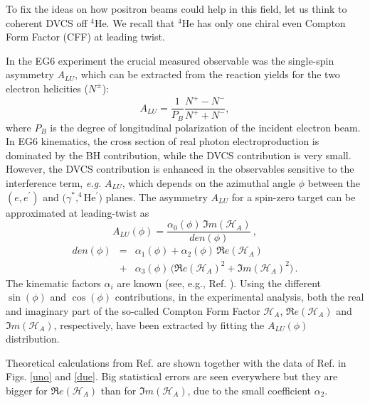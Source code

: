 \documentclass[times, twoside]{PosWhiPap}
\begin{document}
To fix the ideas on how positron beams could help in this field, 
let us think to coherent DVCS off $^4$He.
We recall that
$^4$He has only one chiral even 
Compton Form Factor (CFF) at leading twist.

In the EG6 experiment the crucial measured
observable was the single-spin asymmetry
$A_{LU}$, which can be 
extracted from the reaction yields for the two electron
helicities ($N^{\pm}$):
\begin{equation}
A_{LU} = \frac{1}{P_{B}} \frac{N^{+} - N^{-}}{N^{+} + N^{-} },
\end{equation}
where $P_{B}$ is the degree of longitudinal polarization of the incident 
electron beam.
 In EG6 kinematics, 
the cross section of real photon 
electroproduction is dominated by the BH contribution, while the DVCS 
contribution is very small. However, the DVCS contribution is
enhanced in the observables sensitive to the interference term, {\it e.g.} 
$A_{LU}$, which depends on the
azimuthal angle $\phi$ between the $(e,e^\prime)$ and 
$(\gamma^*,^4$He$^\prime)$ planes.
The asymmetry $A_{LU}$ 
for a spin-zero target can be approximated at leading-twist as
\begin{equation}
A_{LU}(\phi) = 
\frac{\alpha_{0}(\phi) \, \Im m(\mathcal{H}_{A})} 
{den(\phi)} \, ,
\end{equation}
\begin{eqnarray}
den(\phi) & = & 
\alpha_{1}(\phi) + \alpha_{2}(\phi) \, \Re e(\mathcal{H}_{A}) 
\nonumber
\\
& + & \alpha_{3}(\phi) \, 
\big( \Re e(\mathcal{H}_{A})^{2} + \Im m(\mathcal{H}_{A})^{2} \big)\, .
\label{boh}
\end{eqnarray}
The kinematic factors $\alpha_i$ are known
(see, e.g., Ref. \cite{Belitsky:2001ns,Belitsky:2008bz}). Using the different $\sin(\phi)$ and $\cos(\phi)$ contributions, 
in the experimental analysis,
both the real and imaginary part 
of the so-called Compton Form Factor $\mathcal{H}_{A}$,
$\Re e(\mathcal{H}_{A})$ and
$\Im m(\mathcal{H}_{A})$, respectively,
have been extracted 
by fitting the $A_{LU}(\phi)$ distribution.

Theoretical calculations from Ref. \cite{Fucini:2018gso} are shown together with the data of Ref. \cite{Hattawy:2017woc} in Figs. \ref{uno} and \ref{due}.
Big statistical errors are seen everywhere but they are bigger for 
$\Re e(\mathcal{H}_{A})$ than for
$\Im m(\mathcal{H}_{A})$,
due to the small coefficient $\alpha_2$.
\end{document}
